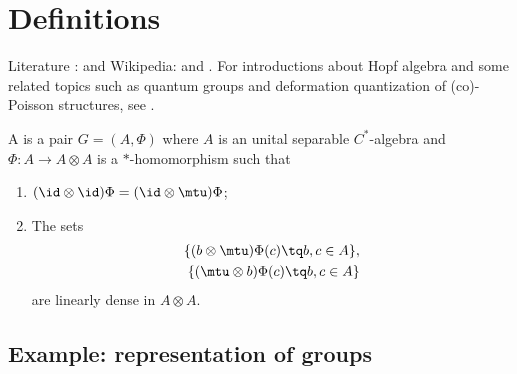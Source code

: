 
\section{Definitions}

Literature : \cite{CompactQuantumGpWoro,Ritter,Kustermans,Koelink} and Wikipedia:  and . For introductions about Hopf algebra and some related topics such as quantum groups and deformation quantization of (co)-Poisson structures, see \cite{Tjin,MaximeRey}.

\begin{definition}
    A  is a pair $G=(A,\Phi)$ where $A$ is an unital separable $C^*$-algebra and $\Phi\colon A\to A\otimes A$ is a $*$-homomorphism such that
    \begin{enumerate}
        \item
            $(\id\otimes\id)\Phi=(\id\otimes\mtu)\Phi$;
        \item
            The sets
            \begin{equation}
                \begin{aligned}[]
                    \{ (b\otimes\mtu)\Phi(c)\tq b,c\in A \},\\
                    \{ (\mtu\otimes b)\Phi(c)\tq b,c\in A \}
                \end{aligned}
            \end{equation}
            are linearly dense in $A\otimes A$.
    \end{enumerate}
\end{definition}

\subsection{Example: representation of groups}

